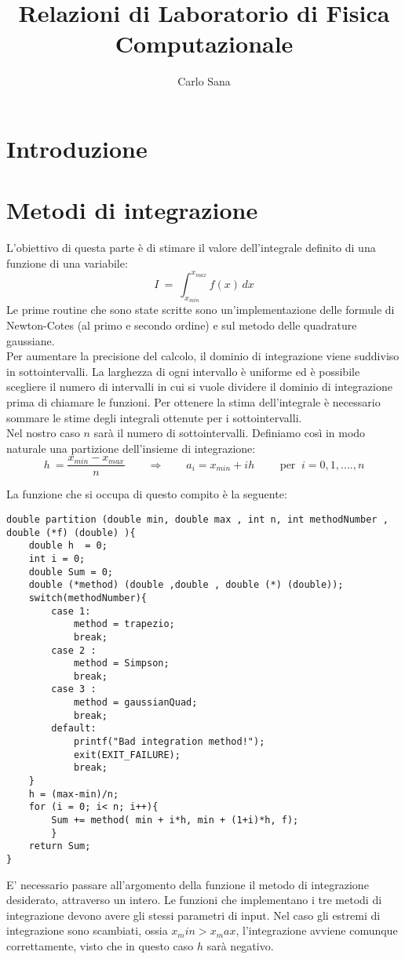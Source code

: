 
\usepackage{minted}
\title{Relazioni di Laboratorio di Fisica Computazionale}
\author{Carlo Sana}



\maketitle
\section{Introduzione}


\section{Metodi di integrazione}
L'obiettivo di questa parte è di stimare il valore dell'integrale definito di una funzione di una variabile:
$$
 	I \ = \ \int_{x_{min}}^{x_{max}} f(x) \, dx
$$
Le prime routine che sono state scritte sono un'implementazione delle formule di Newton-Cotes (al primo e secondo ordine)
e sul metodo delle quadrature gaussiane.\\
Per aumentare la precisione del calcolo, il dominio di integrazione viene suddiviso in sottointervalli.
La larghezza di ogni intervallo è uniforme ed è possibile scegliere il numero di intervalli in cui
si vuole dividere il dominio di integrazione prima di chiamare le funzioni.
Per ottenere la stima dell'integrale è necessario sommare le stime degli integrali ottenute per i sottointervalli.\\
Nel nostro caso $n$ sarà il numero di sottointervalli. Definiamo così in modo naturale una partizione dell'insieme di integrazione:
$$
	h \ = \frac{x_{min} - x_{max}}{ n} \qquad \Longrightarrow \qquad a_i = x_{min} + i h  \qquad
	\mbox{ per } \ i = 0,1,....,n 
$$

La funzione che si occupa di questo compito è la seguente:
\begin{verbatim}
double partition (double min, double max , int n, int methodNumber , double (*f) (double) ){
	double h  = 0;
	int i = 0;
	double Sum = 0;
	double (*method) (double ,double , double (*) (double));
	switch(methodNumber){
		case 1:
			method = trapezio;
			break;
		case 2 :
			method = Simpson;
			break;
		case 3 :
			method = gaussianQuad;
			break;
		default:
			printf("Bad integration method!");
			exit(EXIT_FAILURE);
			break;
	}
	h = (max-min)/n;
	for (i = 0; i< n; i++){
		Sum += method( min + i*h, min + (1+i)*h, f);
		}
	return Sum;
}
\end{verbatim}
E' necessario passare all'argomento della funzione il metodo di integrazione desiderato, attraverso un intero. 
Le funzioni che implementano i tre metodi di integrazione devono avere gli stessi parametri di input.
Nel caso gli estremi di integrazione sono scambiati, ossia $x_min > x_max$, l'integrazione avviene comunque correttamente, visto che in questo caso $h$ sarà negativo.
